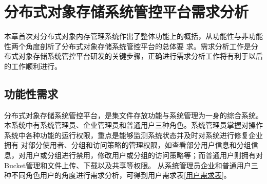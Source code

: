 \chapter{分布式对象存储系统管控平台需求分析}

本章首次对分布式对象内存管理系统作出了整体功能上的概括，从功能性与非功能性两个角度剖析了分布式对象存储系统管控平台的总体要
求。需求分析工作是分布式对象存储系统管控平台研发的关键步骤，正确进行需求分析工作将有利于以后的工作顺利进行。

\section{功能性需求}

分布式对象存储系统管控平台，是集文件存放功能与系统管理为一身的综合系统。
本系统中有系统管理员、企业管理员和普通用户三种角色。系统管理员掌握对操作系统中各种功能的运行权限，重点是能够监测系统状态并及时对系统进行修复企业拥有
对部分使用者、分组和访问策略的管理权限，如查看部分用户信息和分组信息，对用户或分组进行禁用，修改用户或分组的访问策略等；而普通用户则拥有对Bucket管理和文件上传、下载以及共享等权限。
从系统管理员企业和普通用户三种不同角色用户的角度进行需求分析，可得到用户需求表\ref{用户需求表}。





